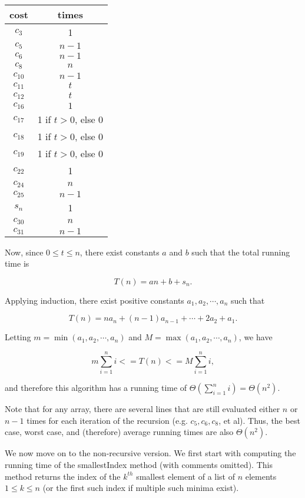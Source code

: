 \documentclass{article}
\begin{document}
\begin{tabular}{|c|c|}
\hline 
cost & times \\ 
\hline 
$c_3$ & 1 \\ 
\hline 
$c_5$ & $n-1$ \\ 
\hline 
$c_6$ & $n-1$ \\ 
\hline 
$c_8$ & $n$ \\ 
\hline 
$c_{10}$ & $n-1$ \\ 
\hline 
$c_{11}$ & $t$ \\ 
\hline 
$c_{12}$ & $t$ \\ 
\hline 
$c_{16}$ & $1$ \\ 
\hline 
$c_{17}$ & 1 if $t>0$, else 0 \\
\hline
$c_{18}$ & 1 if $t>0$, else 0 \\
\hline
$c_{19}$ & 1 if $t>0$, else 0 \\
\hline
$c_{22}$ & 1 \\
\hline
$c_{24}$ & $n$ \\
\hline
$c_{25}$ & $n-1$ \\
\hline
$s_n$ & 1 \\
\hline
$c_{30}$ & $n$ \\
\hline
$c_{31}$ & $n-1$ \\
\hline
\end{tabular} 

\bigskip
\bigskip

Now, since $0 \leq t \leq n$, there exist constants $a$ and $b$ such that the total running time is

\[
	T(n) = an + b + s_n.
\]

\noindent Applying induction, there exist positive constants $a_1, a_2, \cdots, a_n$ such that 

\[
	T(n) = n a_n + (n-1) a_{n-1} + \cdots + 2 a_2 + a_1.
\]

Letting $m = \min(a_1,a_2,\cdots,a_n)$ and $M = \max(a_1,a_2,\cdots,a_n)$, we have

\[
	m \sum\limits_{i=1}^n i <= T(n) <= M \sum\limits_{i=1}^n i,
\]

\noindent and therefore this algorithm has a running time of $\Theta\left(\sum\limits_{i=1}^n i\right) = \Theta(n^2)$.

Note that for any array, there are several lines that are still evaluated either $n$ or $n-1$ times for each iteration of the recursion (e.g. $c_5, c_6, c_8$, et al). Thus, the best case, worst case, and (therefore) average running times are also $\Theta(n^2)$.

We now move on to the non-recursive version. We first start with computing the running time of the smallestIndex method (with comments omitted). This method returns the index of the $k^{th}$ smallest element of a list of $n$ elements $1\leq k \leq n$ (or the first such index if multiple such minima exist).
\end{document}
